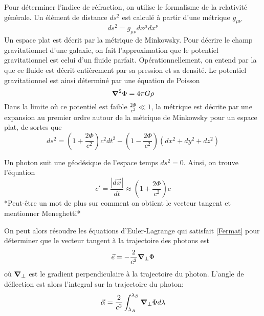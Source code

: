 Pour déterminer l'indice de réfraction, on utilise le formalisme de la relativité 
générale. Un élément de distance $ds^2$ est calculé à partir d'une métrique $g_{\mu \nu}$ 
\begin{equation}\label{eq:ds}
        ds^2 = g_{\mu \nu}dx^{\mu}dx^{\nu}
\end{equation} 
Un espace plat est décrit par la métrique de Minkowsky. Pour décrire le champ 
gravitationnel d'une galaxie, on fait l'approximation que le potentiel gravitationnel 
est celui d'un fluide parfait. Opérationnellement, on entend par la que ce fluide est décrit entièrement 
par sa pression et sa densité. Le potentiel gravitationnel est ainsi déterminé 
par une équation de Poisson 
\begin{equation}\label{eq:Poisson}
       \grad^{2}\Phi = 4\pi G \rho 
\end{equation} 
Dans la limite où ce potentiel est faible $\displaystyle \frac{2\Phi}{c^{2}} \ll 1$, la 
métrique est décrite par une expansion au premier ordre autour de la 
métrique de Minkowsky pour un espace plat, de sortes que
\begin{equation}\label{eq:newton}
        ds^2 = \left( 1 + \frac{2\Phi}{c^{2}} \right)c^{2}dt^{2} - \left( 1 - \frac{2\Phi}{c^{2}} \right)(dx^{2} + dy^{2} + dz^{2})
\end{equation} 

Un photon suit une géodésique de l'espace temps $ds^{2} = 0$. Ainsi, on trouve 
l'équation
\begin{equation}\label{eq:refraction index}
        c' = \frac{|d\vec{x}|}{dt} \approx \left( 1 + \frac{2\Phi}{c^{2}} \right)c
\end{equation} 
*Peut-être un mot de plus sur comment on obtient le vecteur tangent et mentionner 
Meneghetti*

On peut alors résoudre les équations d'Euler-Lagrange qui satisfait \eqref{Fermat} 
pour déterminer que le vecteur tangent à la trajectoire des photons est 
\begin{equation}\label{eq:vecteur tangent}
        \vec{e} = -\frac{2}{c^{2}} \grad_\perp \Phi
\end{equation} 
où $\grad_\perp$ est le gradient perpendiculaire à la trajectoire du photon.
L'angle de déflection est alors l'integral sur la trajectoire du photon:
\begin{equation}\label{eq:deflection true}
        \vec{\alpha} = \frac{2}{c^{2}}\int_{\lambda_A}^{\lambda_B} \grad_\perp \Phi d\lambda
\end{equation} 

